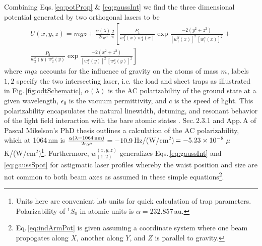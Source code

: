 Combining Eqs.\,\ref{eq:potProp} \& \ref{eq:gaussInt} we find the three dimensional potential generated by two orthogonal lasers to be
\begin{equation} \label{eq:indArmPot}
\begin{split}
	U(x,y,z) = m g z + \frac{\alpha(\lambda)}{2 \epsilon_0 c} \frac{2}{\pi} \left[ \frac{P_1}{w_1^y(x)\, w_1^z(x)} \exp{\frac{-2 (y^2+z^2)}{[w_1^y(x)]^2 \,[w_1^z(x)]^2}} + \right. \\
	\left. \frac{P_2}{w_2^x(y)\, w_2^z(y)} \exp{\frac{-2 (x^2+z^2)}{[w_2^x(y)]^2\,[w_2^z(y)]^2}} \right]
\end{split}
\end{equation}
where $mgz$ accounts for the influence of gravity on the atoms of mass $m$, labels $1,2$ specify the two intersecting laser, i.e. the load and sheet traps as illustrated in Fig.\,\ref{fig:odtSchematic}, $\alpha(\lambda)$ is the AC polarizability of the ground state at a given wavelength, $\epsilon_0$ is the vacuum permittivity, and $c$ is the speed of light.
This polarizability encapsulates the natural linewidth, detuning, and resonant behavior of the light field interaction with the bare atomic states \cite{Grimm1999a}.
Sec.\,2.3.1 and App.\,A of Pascal Mikelson's PhD thesis \cite{Mickelson2010b} outlines a calculation of the AC polarizability, which at 1064\,nm is $\frac{\alpha( \lambda = \text{1064\,nm} )}{2 \epsilon_0 c} = -10.9$\,Hz/(W/cm$^2$)\,$=-5.23\times 10^{-8}$\,$\mu$K/(W/cm$^2$)\footnote{Units here are convenient lab units for quick calculation of trap parameters. Polarizability of $^1S_0$ in atomic units is $\alpha = 232.857$\,au.}.
Furthermore, $w_{(1,2)}^{(x,y,z)}$ generalizes Eqs.\,\ref{eq:gaussInt} and \ref{eq:gaussSpot} for astigmatic laser profiles whereby the waist position and size are not common to both beam axes as assumed in these simple equations\footnote{Eq.\,\ref{eq:indArmPot} is given assuming a coordinate system where one beam propogates along $X$, another along $Y$, and $Z$ is parallel to gravity.}.


